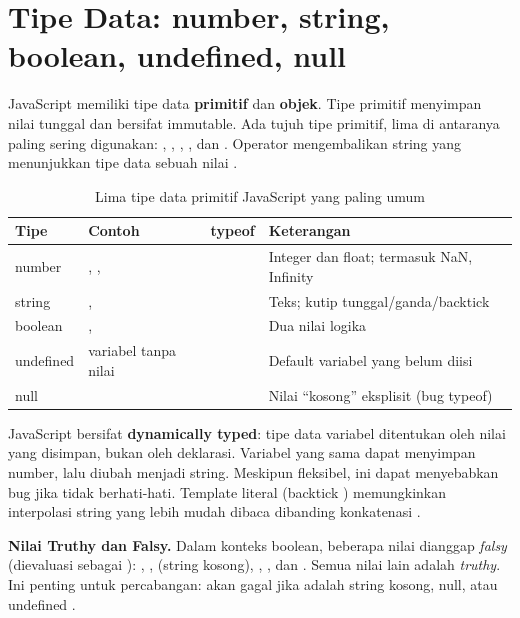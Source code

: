 ﻿\section{Tipe Data: number, string, boolean, undefined, null}

JavaScript memiliki tipe data \textbf{primitif} dan \textbf{objek}. Tipe primitif menyimpan nilai tunggal dan bersifat immutable. Ada tujuh tipe primitif, lima di antaranya paling sering digunakan: , , , , dan . Operator  mengembalikan string yang menunjukkan tipe data sebuah nilai \cite{jsInfo}.

\begin{table}[H]
\centering
\begin{tabular}{|P{2cm}|P{3cm}|P{3cm}|P{4cm}|}
\hline
\textbf{Tipe} & \textbf{Contoh} & \textbf{typeof} & \textbf{Keterangan} \\
\hline
number & , ,  &  & Integer dan float; termasuk NaN, Infinity \\
\hline
string & ,  &  & Teks; kutip tunggal/ganda/backtick \\
\hline
boolean & ,  &  & Dua nilai logika \\
\hline
undefined & variabel tanpa nilai &  & Default variabel yang belum diisi \\
\hline
null &  &  & Nilai ``kosong'' eksplisit (bug typeof) \\
\hline
\end{tabular}
\caption{Lima tipe data primitif JavaScript yang paling umum}
\end{table}

JavaScript bersifat \textbf{dynamically typed}: tipe data variabel ditentukan oleh nilai yang disimpan, bukan oleh deklarasi. Variabel yang sama dapat menyimpan number, lalu diubah menjadi string. Meskipun fleksibel, ini dapat menyebabkan bug jika tidak berhati-hati. Template literal (backtick ) memungkinkan interpolasi string yang lebih mudah dibaca dibanding konkatenasi \cite{mdnJsGuide}.

\begin{catatan}
\textbf{Nilai Truthy dan Falsy.} Dalam konteks boolean, beberapa nilai dianggap \textit{falsy} (dievaluasi sebagai ): , ,  (string kosong), , , dan . Semua nilai lain adalah \textit{truthy}. Ini penting untuk percabangan:  akan gagal jika  adalah string kosong, null, atau undefined \cite{jsInfo}.
\end{catatan}

